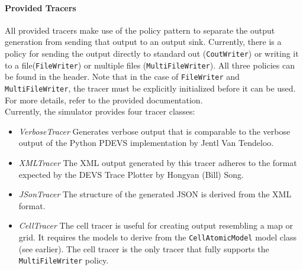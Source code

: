 \paragraph{Provided Tracers}
All provided tracers make use of the policy pattern to separate the output generation from sending that output to an output sink. Currently, there is a policy for sending the output directly to standard out (\lstinline{CoutWriter}) or writing it to a file(\lstinline{FileWriter}) or multiple files (\lstinline{MultiFileWriter}). All three policies can be found in the  header. Note that in the case of \lstinline{FileWriter} and \lstinline{MultiFileWriter}, the tracer must be explicitly initialized before it can be used. For more details, refer to the provided documentation.\\
Currently, the simulator provides four tracer classes:
\begin{itemize}
	\item \emph{VerboseTracer} Generates verbose output that is comparable to the verbose output of the Python PDEVS implementation by Jentl Van Tendeloo.
	\item \emph{XMLTracer} The XML output generated by this tracer adheres to the format expected by the DEVS Trace Plotter by Hongyan (Bill) Song.
	\item \emph{JSonTracer} The structure of the generated JSON is derived from the XML format.
	\item \emph{CellTracer} The cell tracer is useful for creating output resembling a map or grid. It requires the models to derive from the \lstinline{CellAtomicModel} model class (see earlier). The cell tracer is the only tracer that fully supports the \lstinline{MultiFileWriter} policy.
\end{itemize}

